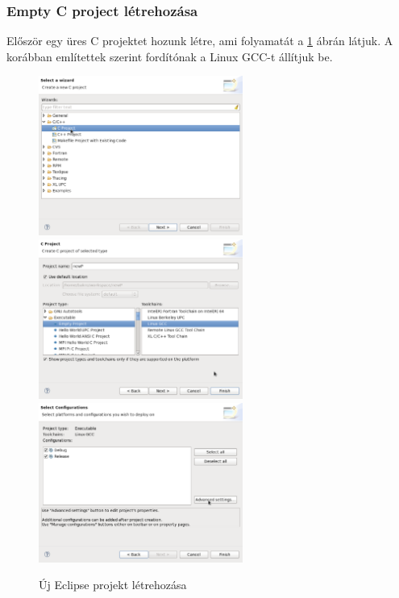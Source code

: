 \subsubsection*{Empty C project létrehozása}
	Először egy üres C projektet hozunk létre, ami folyamatát a \ref{fig:newproj} 
	ábrán látjuk. A korábban említettek szerint fordítónak a Linux GCC-t
	állítjuk be.
	\begin{figure}[!h]
	\centering
		\includegraphics[width=67mm, keepaspectratio]{figures/eps/newC.eps}\hspace{1cm}
		\includegraphics[width=67mm, keepaspectratio]{figures/eps/newP.eps}\\\vspace{5mm}
		\includegraphics[width=67mm, keepaspectratio]{figures/eps/conf.eps}\hspace{1cm}
	\caption{Új Eclipse projekt létrehozása} 
	\label{fig:newproj}
	\end{figure}

